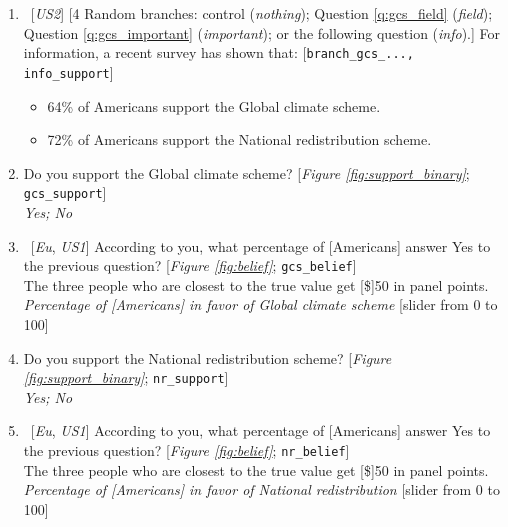 \begin{enumerate}[resume]
 [\textit{Clicking displays the previous summarized descriptions.}]
\item ~[\textit{US2}] [4 Random branches: control (\textit{nothing}); Question \ref{q:gcs_field} (\textit{field}); Question \ref{q:gcs_important} (\textit{important}); or the following question (\textit{info}).] \label{q:info_support} For information, a recent survey has shown that: [\verb|branch_gcs_..., info_support|]
\begin{itemize} 
    \item 64\% of Americans support the Global climate scheme. 	
    \item 72\% of Americans support the National redistribution scheme. 
\end{itemize}
\item  \label{q:gcs_support} Do you support the Global climate scheme? [\textit{Figure \ref{fig:support_binary}}; \verb|gcs_support|]
\\ \textit{Yes; No}
\item ~[\textit{Eu}, \textit{US1}]  \label{q:gcs_belief} According to you, what percentage of [Americans] answer Yes to the previous question? [\textit{Figure \ref{fig:belief}}; \verb|gcs_belief|]\\
The three people who are closest to the true value get [\$]50 in panel points.
\\ \textit{Percentage of [Americans] in favor of Global climate scheme} [slider from 0 to 100]
\item  \label{q:nr_support} Do you support the National redistribution scheme? [\textit{Figure \ref{fig:support_binary}}; \verb|nr_support|]
\\ \textit{Yes; No}
\item ~[\textit{Eu}, \textit{US1}]  \label{q:nr_belief} According to you, what percentage of [Americans] answer Yes to the previous question? [\textit{Figure \ref{fig:belief}}; \verb|nr_belief|]\\
The three people who are closest to the true value get [\$]50 in panel points.
\\ \textit{Percentage of [Americans] in favor of National redistribution } [slider from 0 to 100]

\end{enumerate}
